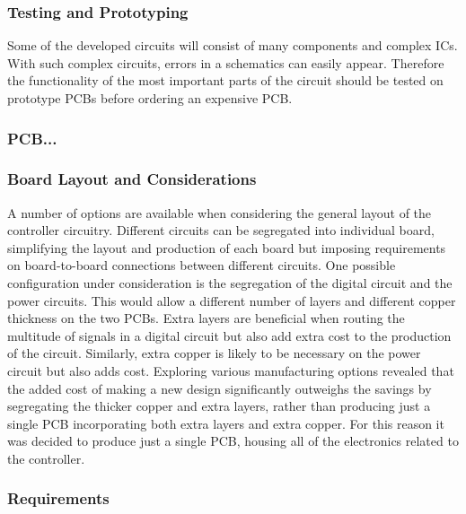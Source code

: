 \subsubsection{Testing and Prototyping} %
Some of the developed circuits will consist of many components and complex ICs.
With such complex circuits, errors in a schematics can easily appear.
Therefore the functionality of the most important parts of the circuit should be tested on prototype PCBs before ordering an expensive PCB.

\subsubsection{PCB...} %


\subsubsection{Board Layout and Considerations} %
\label{ssub:board_layout_and_considerations}
A number of options are available when considering the general layout of the controller circuitry.
Different circuits can be segregated into individual board, simplifying the layout and production of each board but imposing requirements on board-to-board connections between different circuits.
One possible configuration under consideration is the segregation of the digital circuit and the power circuits.
This would allow a different number of layers and different copper thickness on the two PCBs.
Extra layers are beneficial when routing the multitude of signals in a digital circuit but also add extra cost to the production of the circuit.
Similarly, extra copper is likely to be necessary on the power circuit but also adds cost.
Exploring various manufacturing options revealed that the added cost of making a new design significantly outweighs the savings by segregating the thicker copper and extra layers, rather than producing just a single PCB incorporating both extra layers and extra copper.
For this reason it was decided to produce just a single PCB, housing all of the electronics related to the controller.

\clearpage
\subsubsection{Requirements}

